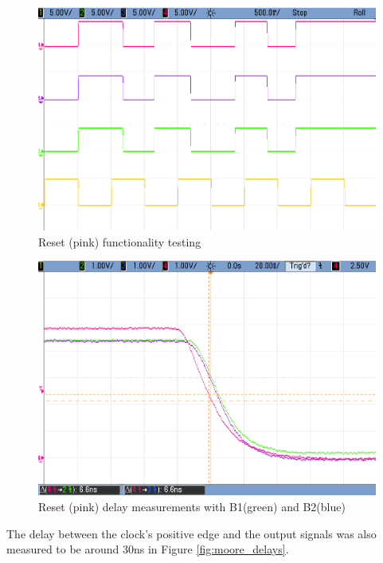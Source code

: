 \begin{figure}[ht]
    \begin{center}
        \includegraphics[width=0.75\linewidth]{./images/e3e1_1_4nreset.png}
        \caption{Reset (pink) functionality testing}
        \label{fig:moore_nres}
    \end{center}
\end{figure}

\begin{figure}[ht]
    \begin{center}
        \includegraphics[width=0.75\linewidth]{./images/e3e1_nreset_delay.png}
        \caption{Reset (pink) delay measurements with B1(green) and B2(blue)}
        \label{fig:moore_nres_delay}
    \end{center}
\end{figure}

The delay between the clock's positive edge and the output signals was also measured to be around 30ns in Figure \ref{fig:moore_delays}.

